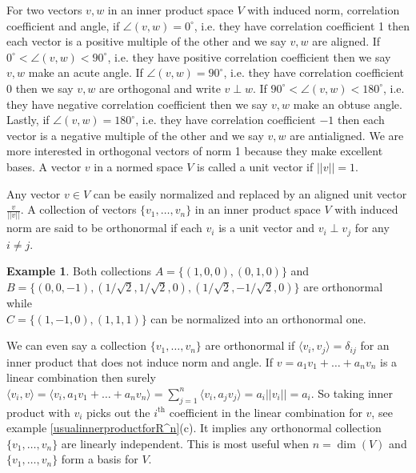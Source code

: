 \documentclass[12pt]{amsart}
\theoremstyle{definition}
\newtheorem{example}[theorem]{Example}
\begin{document}
For two vectors $v, w$ in an inner product space $V$ with induced norm, correlation coefficient and angle, if $\angle(v, w) = 0^{\circ}$, i.e. they have correlation coefficient 1 then each vector is a positive multiple of the other and we say $v, w$ are aligned. If $0^{\circ} < \angle(v, w) < 90^{\circ}$, i.e. they have positive correlation coefficient then we say $v, w$ make an acute angle. If $\angle(v, w) = 90^{\circ}$, i.e. they have correlation coefficient 0 then we say $v, w$ are orthogonal and write $v \perp w$. If $90^{\circ} < \angle(v, w) < 180^{\circ}$, i.e. they have negative correlation coefficient then we say $v, w$ make an obtuse angle. Lastly, if $\angle(v, w) = 180^{\circ}$, i.e. they have correlation coefficient $-1$ then each vector is a negative multiple of the other and we say $v, w$ are antialigned. We are more interested in orthogonal vectors of norm 1 because they make excellent bases.
\dfn A vector $v$ in a normed space $V$ is called a unit vector if $||v|| = 1$.

Any vector $v \in V$ can be easily normalized and replaced by an aligned unit vector $\frac{v}{||v||}$.
\dfn A collection of vectors $\{v_1, \dots, v_n\}$ in an inner product space $V$ with induced norm are said to be orthonormal if each $v_i$ is a unit vector and $v_i \perp v_j$ for any $i \neq j$.

\begin{example}\label{orthonormalvectors} Both collections $A = \{(1,0,0), (0,1,0)\}$ and\\
$B = \{(0,0,-1), (1/\sqrt{2}, 1/\sqrt{2}, 0), (1/\sqrt{2}, -1/\sqrt{2},0)\}$ are orthonormal while\\
$C = \{(1,-1,0), (1,1,1)\}$ can be normalized into an orthonormal one.
\end{example}

We can even say a collection $\{v_1, \dots, v_n\}$ are orthonormal if $\langle v_i, v_j \rangle = \delta_{ij}$ for an inner product that does not induce norm and angle. If $v = a_1 v_1 + \ldots + a_n v_n$ is a linear combination then surely $\langle v_i, v \rangle = \langle v_i, a_1 v_1 + \ldots + a_n v_n \rangle = \sum\limits_{j=1}^n \langle v_i, a_j v_j \rangle = a_i ||v_i|| = a_i$. So taking inner product with $v_i$ picks out the $i^{\text{th}}$ coefficient in the linear combination for $v$, see example \ref{usualinnerproductforR^n}(c). It implies any orthonormal collection $\{v_1, \dots, v_n\}$ are linearly independent. This is most useful when $n = \dim(V)$ and $\{v_1, \dots, v_n\}$ form a basis for $V$.
\end{document}
